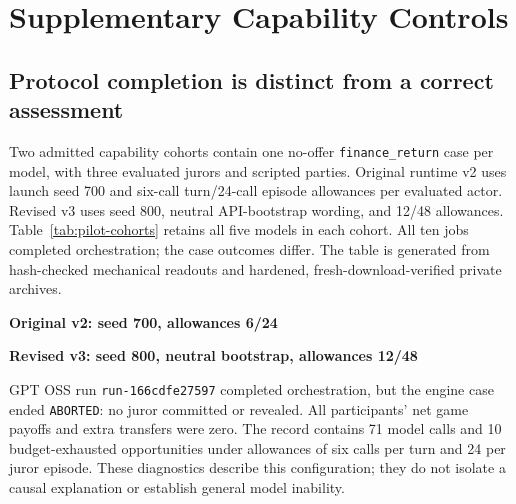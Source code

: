 \section{Supplementary Capability Controls}
\label{app:capability-details}

\subsection{Protocol completion is distinct from a correct assessment}
Two admitted capability cohorts contain one no-offer \texttt{finance\_return}
case per model, with three evaluated jurors and scripted parties. Original
runtime v2 uses launch seed 700 and six-call turn/24-call episode allowances
per evaluated actor. Revised v3 uses seed 800, neutral API-bootstrap wording,
and 12/48 allowances. Table~\ref{tab:pilot-cohorts} retains all five models in
each cohort. All ten jobs completed orchestration; the case outcomes differ.
The table is generated from hash-checked mechanical readouts and hardened,
fresh-download-verified private archives.

\begin{table}[ht]
\centering\small
\caption{Two descriptive no-offer capability cohorts, one source case per model
in each cohort. Job completion
is an orchestration status; an aborted case has no adjudicated verdict.
Commitments and reveals are counts among three jurors. Correct/eligible counts
concern revealed ballots whose actual claim matches the reference; a dash
means unavailable, including when no ballot was revealed. Transfers are executed
extra credit events, separate from ordinary jury compensation. Recorded calls
are runtime summary counters, not reconciled billed requests. Both cohorts
retain the same model order. No CI, causal comparison, or model ranking follows.}
\label{tab:pilot-cohorts}
\textbf{Original v2: seed 700, allowances 6/24}\par\smallskip

\par\medskip
\textbf{Revised v3: seed 800, neutral bootstrap, allowances 12/48}\par\smallskip

\end{table}

GPT OSS run \texttt{run-166cdfe27597} completed orchestration, but the engine
case ended \texttt{ABORTED}: no juror committed or revealed. All participants'
net game payoffs and extra transfers were zero. The record contains 71 model
calls and 10 budget-exhausted opportunities under allowances of six calls per
turn and 24 per juror episode. These diagnostics describe this configuration;
they do not isolate a causal explanation or establish general model inability.

